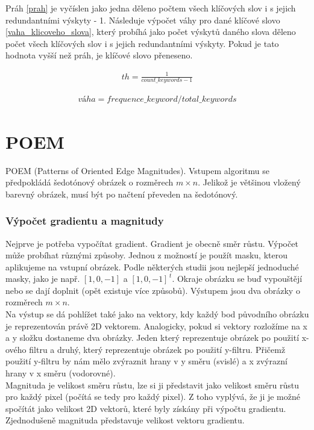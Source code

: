 \documentclass[czech,BP]{thesiskiv}
\begin{document}
\par Práh \eqref{prah} je vyčíslen jako jedna děleno počtem všech klíčových slov i s jejich redundantními výskyty - 1. Následuje výpočet váhy pro dané klíčové slovo \eqref{vaha_klicoveho_slova}, který probíhá jako počet výskytů daného slova děleno počet všech klíčových slov i s jejich redundantními výskyty. Pokud je tato hodnota vyšší než práh, je klíčové slovo přeneseno.

\begin{align}
   \label{prah} th = \frac{1}{count\_keywords-1}
\end{align}

\begin{align}
   \label{vaha_klicoveho_slova} váha = frequence\_keyword / total\_keywords
\end{align} 
 
\chapter{POEM}
POEM (Patterns of Oriented Edge Magnitudes). Vstupem algoritmu se předpokládá šedotónový obrázek o rozměrech  $m \times n$. Jelikož je většinou vložený barevný obrázek, musí být po načtení převeden na šedotónový. \cite{SrovnaniDeskriptoru}

\subsection{Výpočet gradientu a magnitudy}
Nejprve je potřeba vypočítat gradient. Gradient je obecně směr růstu. Výpočet může probíhat různými způsoby. Jednou z možností je použít masku, kterou aplikujeme na vstupní obrázek. Podle některých studii jsou nejlepší jednoduché masky, jako je např. $[1, 0, -1]$ a $[1, 0, -1]^{\,t}$. Okraje obrázku se buď vypouštějí nebo se dají doplnit (opět existuje více způsobů). Výstupem jsou dva obrázky o rozměrech $m \times n$. \\
Na výstup se dá pohlížet také jako na vektory, kdy každý bod původního obrázku je reprezentován právě 2D vektorem. Analogicky, pokud si vektory rozložíme na x a y složku dostaneme dva obrázky. Jeden který reprezentuje obrázek po použití x-ového filtru a druhý, který reprezentuje obrázek po použití y-filtru. Přičemž použití y-filtru by nám mělo zvýraznit hrany v y směru (svislé) a x zvýrazní hrany v x směru (vodorovné). \\

Magnituda je velikost směru růstu, lze si ji představit jako velikost směru růstu pro každý pixel (počítá se tedy pro každý pixel).  Z toho vyplývá, že ji je možné spočítát jako velikost 2D vektorů, které byly získány při výpočtu gradientu. Zjednodušeně magnituda představuje velikost vektoru gradientu. \\
\end{document}
